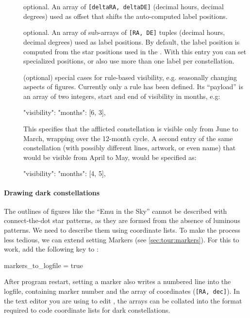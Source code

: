 \begin{description}
\item[] optional. An array of \texttt{[deltaRA, deltaDE]} (decimal hours, decimal degrees) 
                            used as offset that shifts the auto-computed label positions. 

\item[] optional. An array of sub-arrays of \texttt{[RA, DE]} tuples (decimal hours, decimal degrees) used as label positions. 
                               By default, the label position is computed from the star positions used in the . 
			                   With this entry you can set specialized positions, or also use more than one label per constellation. 
\item[] (optional) special cases for rule-based visibility, e.g. seasonally changing aspects of figures. 
	Currently only a  rule has been defined. 
	Its ``payload'' is an array of two integers, start and end of visibility in months, e.g:

	\begin{jsonfile}
"visibility": {"months": [6, 3]},
	\end{jsonfile}
%
This specifies that the afflicted constellation is visible only from June to March, wrapping over the 12-month cycle. 
A second entry of the same constellation (with possibly different lines, artwork, or even name) 
that would be visible from April to May, would be specified as:
\begin{jsonfile}
"visibility": {"months": [4, 5]},
\end{jsonfile}
\end{description}


\paragraph{Drawing dark constellations}\label{SC:constellations:dark:markers}
The outlines of figures like the ``Emu in the Sky'' cannot be described with connect-the-dot star patterns, 
as they are formed from the absence of luminous patterns. We need to describe them using coordinate lists. 
To make the process less tedious, we can extend setting Markers (see \ref{sec:tour:markers}). 
For this to work, add the following key to :
\begin{configfile}
[devel]
markers_to_logfile = true
\end{configfile}
After program restart, setting a marker also writes a numbered line into the logfile, 
containing marker number and the array of coordinates (\texttt{[RA, dec]}). 
In the text editor you are using to edit , 
the arrays can be collated into the format required to code coordinate lists for dark constellations.

